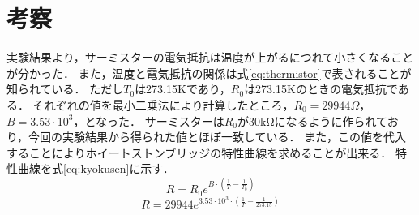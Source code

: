 \documentclass[a4paper,11pt]{ltjsarticle}
\begin{document}
\section{考察}
実験結果より，サーミスターの電気抵抗は温度が上がるにつれて小さくなることが分かった．
また，温度と電気抵抗の関係は式\eqref{eq:thermistor}で表されることが知られている．
ただし$T_0$は273.15Kであり，$R_0$は273.15Kのときの電気抵抗である．
それぞれの値を最小二乗法により計算したところ，$R_0 = 29944Ω$，$B = 3.53 \cdot 10^3$，となった．
サーミスターは$R_0$が30kΩになるように作られており，今回の実験結果から得られた値とほぼ一致している．
また，この値を代入することによりホイートストンブリッジの特性曲線を求めることが出来る．
特性曲線を式\eqref{eq:kyokusen}に示す．
\begin{equation}
  R = R_0 e^{ B \cdot \left( \frac{1}{T} - \frac{1}{T_0} \right)}
  \label{eq:thermistor}
\end{equation}
\begin{equation}
  R = 29944 e^{ 3.53 \cdot 10^3 \cdot \left( \frac{1}{T} - \frac{1}{273.15} \right)}
  \label{eq:kyokusen}
\end{equation}
\end{document}

